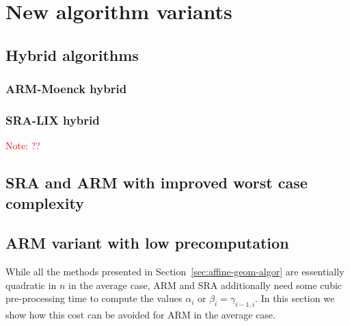 \documentclass{article}
\newcounter{algo}
\newcommand{\Notes}[1]{\textcolor{red}{Note: #1}}
\begin{document}
\section{New algorithm variants}
\label{sec:new-variants}

\subsection{Hybrid algorithms}
\label{sec:hybrid-algorithms}

\subsubsection{ARM-Moenck hybrid}
\subsubsection{SRA-LIX hybrid}
\Notes{??}



\subsection{SRA and ARM with improved worst case complexity}
\label{sec:worst-case}


\subsection{ARM variant with low precomputation}
\label{sec:low-precomputation}

While all the methods presented in Section~\ref{sec:affine-geom-algor} are essentially quadratic in $n$ in the average case, ARM and SRA additionally need some cubic pre-processing time to compute the values $\alpha_i$ or $\beta_i=\gamma_{i-1,i}$.
%
In this section we show how this cost can be avoided for ARM in the average case. %
\end{document}
